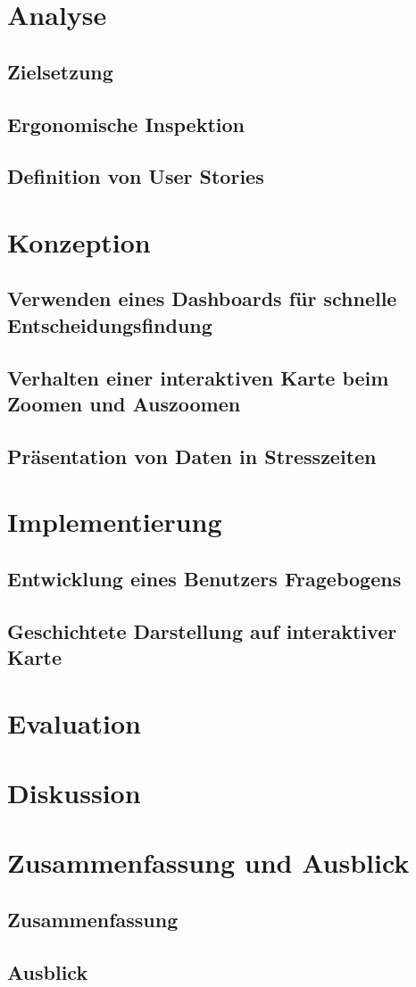 



\chapter{Analyse}
\section{Zielsetzung}
\section{Ergonomische Inspektion}
\section{Definition von User Stories}

\chapter{Konzeption}
\section{Verwenden eines Dashboards für schnelle Entscheidungsfindung}
\section{Verhalten einer interaktiven Karte beim Zoomen und Auszoomen}
\section{Präsentation von Daten in Stresszeiten}

\chapter{Implementierung}
\section{Entwicklung eines Benutzers Fragebogens}
\section{Geschichtete Darstellung auf interaktiver Karte}

\chapter{Evaluation}

\chapter{Diskussion}

\chapter{Zusammenfassung und Ausblick}
\section{Zusammenfassung}
\section{Ausblick}
